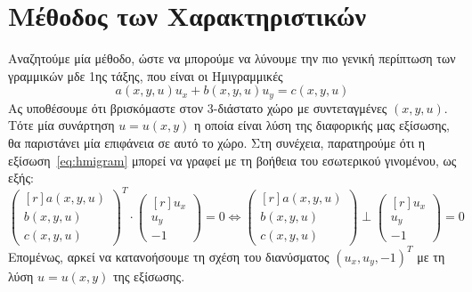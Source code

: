 \section{Μέθοδος των Χαρακτηριστικών}
Αναζητούμε μία μέθοδο, ώστε να μπορούμε να λύνουμε την πιο γενική περίπτωση των 
γραμμικών μδε 1ης τάξης, που είναι οι Ημιγραμμικές
\begin{equation}\label{eq:hmigram}
  a(x,y,u)u_{x}+b(x,y,u)u_{y}=c(x,y,u) 
\end{equation}
Ας υποθέσουμε ότι βρισκόμαστε στον 3-διάστατο χώρο με συντεταγμένες $ (x,y,u) $. 
Τότε μία συνάρτηση $ u=u(x,y) $ η οποία είναι λύση της διαφορικής μας εξίσωσης, θα 
παριστάνει μία επιφάνεια σε αυτό το χώρο. Στη συνέχεια, παρατηρούμε ότι η
εξίσωση~\eqref{eq:hmigram} μπορεί να γραφεί με τη βοήθεια του εσωτερικού γινομένου, ως
εξής:
\begin{equation}\label{eq:perp}
  \begin{pmatrix*}[r] a(x,y,u) \\ b(x,y,u) \\ c(x,y,u) \end{pmatrix*}^{T} \cdot 
  \begin{pmatrix*}[r] u_{x} \\ u_{y} \\ -1 \end{pmatrix*} = 0 \Leftrightarrow 
  \begin{pmatrix*}[r] a(x,y,u) \\ b(x,y,u) \\ c(x,y,u) \end{pmatrix*} \perp 
  \begin{pmatrix*}[r] u_{x} \\ u_{y} \\ -1 \end{pmatrix*} = 0 
\end{equation}
Επομένως, αρκεί να κατανοήσουμε τη σχέση του διανύσματος $ (u_{x},u_{y},-1)^{T} $ 
με τη λύση $ u=u(x,y) $ της εξίσωσης.

